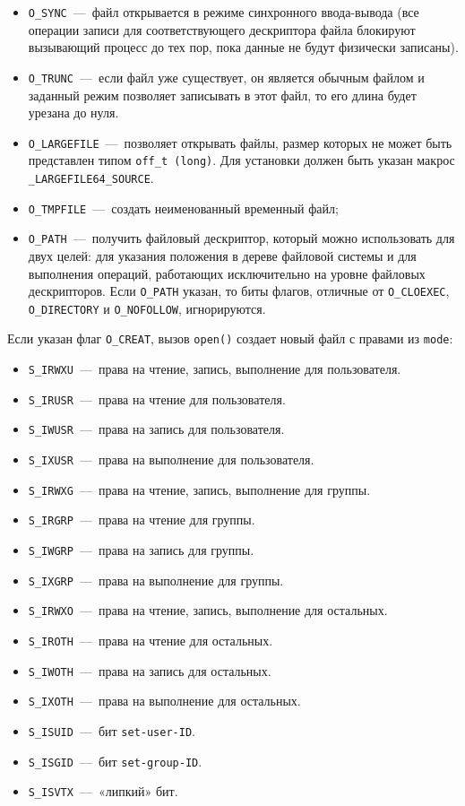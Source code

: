 \begin{itemize}
	\item \texttt{O\_SYNC}~---~файл открывается в режиме синхронного ввода-вывода (все операции записи для соответствующего дескриптора файла блокируют вызывающий процесс до тех пор, пока данные не будут физически записаны).
	\item \texttt{O\_TRUNC}~---~если файл уже существует, он является обычным файлом и заданный режим позволяет записывать в этот файл, то его длина будет урезана до нуля.
	\item \texttt{O\_LARGEFILE}~---~позволяет открывать файлы, размер которых не может быть представлен типом \texttt{off\_t (long)}. Для установки должен быть указан макрос \\ \texttt{\_LARGEFILE64\_SOURCE}.
	\item \texttt{O\_TMPFILE}~---~создать неименованный временный файл;
	\item \texttt{O\_PATH}~---~получить файловый дескриптор, который можно использовать для двух целей: для указания положения в дереве файловой системы и для выполнения операций, работающих исключительно на уровне файловых дескрипторов. Если \texttt{O\_PATH} указан, то биты флагов, отличные от \texttt{O\_CLOEXEC}, \texttt{O\_DIRECTORY} и \texttt{O\_NOFOLLOW}, игнорируются.
\end{itemize}

Если указан флаг \texttt{O\_CREAT}, вызов \texttt{open()} создает новый файл с правами из  \texttt{mode}:

\begin{itemize}
	\item \texttt{S\_IRWXU}~---~права на чтение, запись, выполнение для пользователя.
	\item \texttt{S\_IRUSR}~---~права на чтение для пользователя.
	\item \texttt{S\_IWUSR}~---~права на запись для пользователя.
	\item \texttt{S\_IXUSR}~---~права на выполнение для пользователя.
	\item \texttt{S\_IRWXG}~---~права на чтение, запись, выполнение для группы.
	\item \texttt{S\_IRGRP}~---~права на чтение для группы.
	\item \texttt{S\_IWGRP}~---~права на запись для группы.
	\item \texttt{S\_IXGRP}~---~права на выполнение для группы.
	\item \texttt{S\_IRWXO}~---~права на чтение, запись, выполнение для остальных.
	\item \texttt{S\_IROTH}~---~права на чтение для остальных.
	\item \texttt{S\_IWOTH}~---~права на запись для остальных.
	\item \texttt{S\_IXOTH}~---~права на выполнение для остальных.
	\item \texttt{S\_ISUID}~---~бит \texttt{set-user-ID}.
	\item \texttt{S\_ISGID}~---~бит \texttt{set-group-ID}.
	\item \texttt{S\_ISVTX}~---~«липкий» бит.
\end{itemize}

